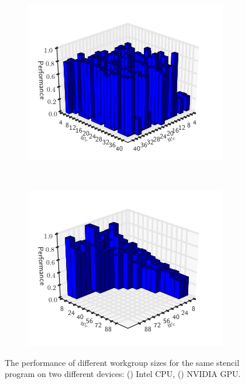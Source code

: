 \documentclass[nonatbib,preprint,9pt]{sigplanconf}
\begin{document}
\begin{figure}
\centering
\begin{subfigure}[h]{.45\columnwidth}
\centering
\includegraphics[width=1.0\columnwidth]{img/motivation_1}
\vspace{-1.5em} %
\caption{}
\label{fig:motivation-1}
\end{subfigure}
~%
\begin{subfigure}[h]{.45\columnwidth}
\centering
\includegraphics[width=1.0\columnwidth]{img/motivation_2}
\vspace{-1.5em} %
\caption{}
\label{fig:motivation-2}
\end{subfigure}
\caption{%
  The performance of different workgroup sizes for the same stencil
  program on two different devices: () Intel
  CPU, () NVIDIA GPU.%
}
\label{fig:motivation-arch}
\end{figure}
\end{document}
